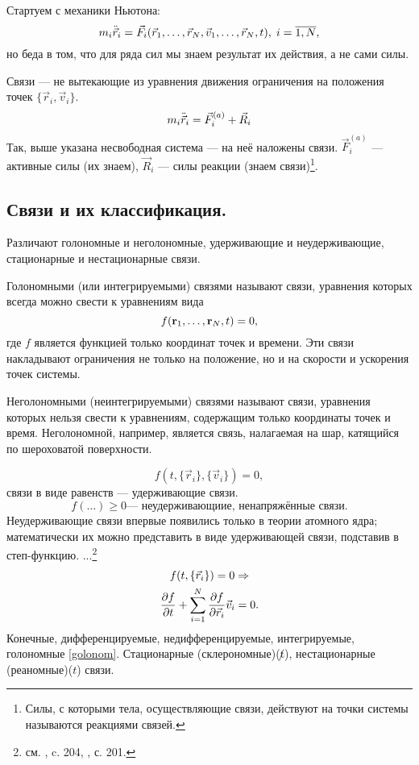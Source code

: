 Стартуем с механики Ньютона:
\[m_i \Ddot{\vec{r}}_i = \Vec{F}_i (\vec{r}_1, \ldots, \vec{r}_N, \vec{v}_1, \ldots, \vec{r}_N, t),\; i=\overline{1,N}, \] но беда в том, что для ряда сил мы знаем результат их действия, а не сами силы.
\begin{dfn}
Связи  --- не вытекающие из уравнения движения ограничения на положения точек $\lbrace\vec{r}_i, \vec{v}_i\rbrace$.
\[m_i \Ddot{\vec{r}}_i = \vec{F}_i^{(a)} + \vec{R}_i \] Так, выше указана несвободная система  --- на неё наложены связи. $\vec{F}_i^{(a)}$ --- активные силы (их знаем), $\vec{R}_i$ --- силы реакции (знаем связи)\footnote{Силы, с которыми  тела, осуществляющие связи, действуют на точки системы называются реакциями связей.}.
\end{dfn}
\subsection{Связи и их классификация.}
Различают голономные и неголономные, удерживающие и неудерживающие, стационарные и нестационарные связи.
\begin{dfn}
Голономными (или интегрируемыми) связями называют связи, уравнения которых всегда можно свести к уравнениям вида
\begin{equation}
f(\vb{r}_1, \ldots, \vb{r}_N, t) = 0,
\end{equation}
где $f$ является функцией только координат точек и времени. Эти связи накладывают ограничения не только на положение, но и на скорости и ускорения точек системы.
\end{dfn}
\begin{dfn}
Неголономными  (неинтегрируемыми) связями называют связи, уравнения которых нельзя свести к уравнениям, содержащим только координаты точек и время. Неголономной, например, является связь, налагаемая на шар, катящийся по шероховатой поверхности.
\end{dfn}

\[f(t, \lbrace\vec{r}_i\rbrace, \lbrace\vec{v}_i \rbrace) = 0,\] связи в виде равенств --- удерживающие связи. 
\[f(\dots) \geqslant 0 \text{--- неудерживающиие, ненапряжённые связи.}\]  Неудерживающие связи впервые появились только в теории атомного ядра; математически их можно представить в виде удерживающей связи, подставив в степ-функцию.
...\footnote{см. \cite{OlhTM}, c. 204, \cite{GantnakherTM}, с. 201.}
\begin{gather}
f(t, \lbrace\vec{r}_i\rbrace) = 0 \Rightarrow \notag\\
\pdv{f}{t} + \sum_{i=1}^N \pdv{f}{\vec{r}_i} \vec{v}_i = 0. \label{golonom}
\end{gather}
Конечные, дифференцируемые, недифференцируемые, интегрируемые, голономные \eqref{golonom}.
Стационарные (склерономные)($\not t$), нестационарные (реаномные)($t$) связи.
\begin{ex}

\end{ex}

